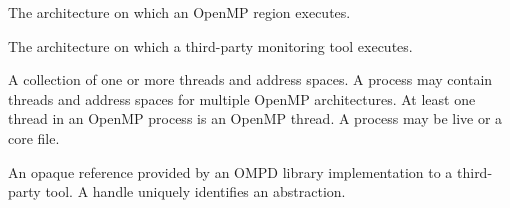 {\begin{comment}
}
{\color{blue}
\end{comment}

\glossarydefstart
The architecture on which an OpenMP region executes.
\glossarydefend

\glossarydefstart
The architecture on which a third-party monitoring tool executes.
\glossarydefend

\glossarydefstart
A collection of one or more threads and address spaces. A process may contain threads and address spaces for multiple OpenMP architectures.
At least one thread in an OpenMP process is an OpenMP thread.
A process may be live or a core file. 
\glossarydefend

\glossarydefstart
An opaque reference provided by an OMPD library implementation to a third-party tool. A handle uniquely identifies an abstraction.

\glossarydefend

}
